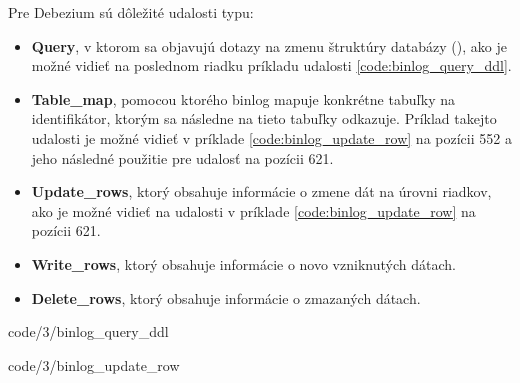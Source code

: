 Pre Debezium sú dôležité udalosti typu:
\begin{itemize}
\item \textbf{Query}, v ktorom sa objavujú dotazy na zmenu štruktúry databázy (), ako je možné vidieť na poslednom riadku príkladu udalosti \ref{code:binlog_query_ddl}.
\item \textbf{Table\_map}, pomocou ktorého binlog mapuje konkrétne tabuľky na identifikátor, ktorým sa následne na tieto tabuľky odkazuje. Príklad takejto udalosti je možné vidieť v príklade \ref{code:binlog_update_row} na pozícii 552 a jeho následné použitie pre udalosť na pozícii 621. 
\item \textbf{Update\_rows}, ktorý obsahuje informácie o zmene dát na úrovni riadkov, ako je možné vidieť na udalosti v príklade \ref{code:binlog_update_row} na pozícii 621.
\item \textbf{Write\_rows}, ktorý obsahuje informácie o novo vzniknutých dátach.
\item \textbf{Delete\_rows}, ktorý obsahuje informácie o zmazaných dátach.
\end{itemize}


            {code/3/binlog_query_ddl}


            {code/3/binlog_update_row}
            
